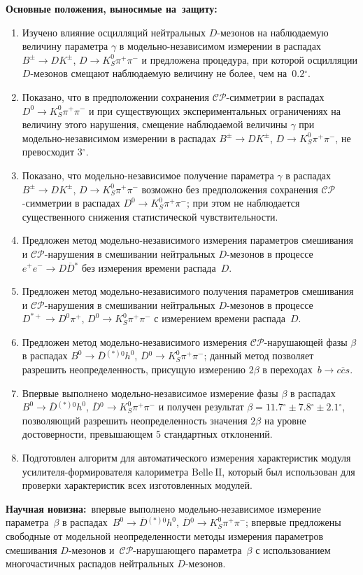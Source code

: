 \documentclass[a4paper,14pt]{extarticle} %
\newcommand{\dn}{\ensuremath{D^0}\xspace}
\newcommand{\bn}{\ensuremath{B^0}\xspace}
\newcommand{\hn}{\ensuremath{h^0}\xspace}
\newcommand{\dbar}{\ensuremath{\overline{D}}\xspace}
\newcommand{\ddbar}{\ensuremath{D\dbar}\xspace}
\newcommand{\dnbar}{\ensuremath{\dbar{}^0}\xspace}
\newcommand{\dstp}{\ensuremath{D^{*+}}\xspace}
\newcommand{\dstarnbar}{\ensuremath{\dbar{}^{(*)0}}\xspace}
\newcommand{\ks}{\ensuremath{K_S^0}\xspace}
\newcommand{\pphi}{\ensuremath{\beta}\xspace}
\newcommand{\gphi}{\ensuremath{\gamma}\xspace}
\newcommand{\bdk}{\ensuremath{B^{\pm}\to D K^{\pm}}\xspace}
\newcommand{\dkpp}{\ensuremath{D\to\ks\pi^+\pi^-}\xspace}
\newcommand{\dnkpp}{\ensuremath{\dn\to\ks\pi^+\pi^-}\xspace}
\newcommand{\dbkpp}{\ensuremath{\dnbar\to\ks\pi^+\pi^-}\xspace}
\newcommand{\bdsth}{\ensuremath{\bn\to\dstarnbar\hn}\xspace}
\newcommand{\dstpdpip}{\ensuremath{\dstp\to\dn\pi^+}\xspace}
\newcommand{\btoccs}{\ensuremath{b\to c\overline{c}s}\xspace}
\newcommand{\ep}{\ensuremath{e^+e^-}\xspace}
\newcommand{\cpconj}{\ensuremath{\mathcal{CP}}\xspace}
\newcommand{\grad}{\ensuremath{^{\circ}}\xspace}
\newcommand{\belle}{\ensuremath{\mathrm{Belle}}\xspace}
\newcommand{\belleii}{\ensuremath{\belle\:\mathrm{II}}\xspace}
\begin{document}
\textbf{Основные положения, выносимые на~защиту:}
\begin{enumerate}
  \item Изучено влияние осцилляций нейтральных $D$-мезонов на наблюдаемую величину параметра \gphi в модельно-независимом измерении в распадах \bdk, \dkpp и предложена процедура, при которой осцилляции $D$-мезонов смещают наблюдаемую величину не более, чем на~$0.2\grad$.
  \item Показано, что в предположении сохранения \cpconj-симметрии в распадах \dnkpp и при существующих экспериментальных ограничениях на величину этого нарушения, смещение наблюдаемой величины \gphi при модельно-независимом измерении в распадах \bdk, \dkpp, не превосходит $3\grad$.
  \item Показано, что модельно-независимое получение параметра \gphi в распадах \bdk, \dkpp возможно без предположения сохранения \cpconj-симметрии в распадах \dnkpp; при этом не наблюдается существенного снижения статистической чувствительности.
  \item Предложен метод модельно-независимого измерения параметров смешивания и \cpconj-нарушения в смешивании нейтральных $D$-мезонов в процессе $\ep\to \ddbar{}^{*}$ без измерения времени распада~$D$.
  \item Предложен метод модельно-независимого получения параметров смешивания и \cpconj-нарушения в смешивании нейтральных $D$-мезонов в процессе \dstpdpip, \dnkpp с измерением времени распада~$D$.
  \item Предложен метод модельно-независимого измерения \cpconj-нарушающей фазы \pphi в распадах \bdsth, \dbkpp; данный метод позволяет разрешить неопределенность, присущую измерению $2\pphi$ в переходах~\btoccs.
  \item Впервые выполнено модельно-независимое измерение фазы \pphi в распадах \bdsth, \dbkpp и получен результат $\pphi = 11.7\grad\pm7.8\grad\pm2.1\grad$, позволяющий разрешить неопределенность значения $2\pphi$ на уровне достоверности, превышающем $5$ стандартных отклонений.
  \item Подготовлен алгоритм для автоматического измерения характеристик модуля усилителя-формирователя калориметра \belleii, который был использован для проверки характеристик всех изготовленных модулей.
\end{enumerate}

\textbf{Научная новизна:}\ впервые выполнено модельно-независимое измерение параметра~\pphi в распадах~\bdsth, \dbkpp; впервые предложены свободные от модельной неопределенности методы измерения параметров смешивания $D$-мезонов и~\cpconj-нарушающего параметра~\pphi с использованием многочастичных распадов нейтральных $D$-мезонов.
\end{document}

